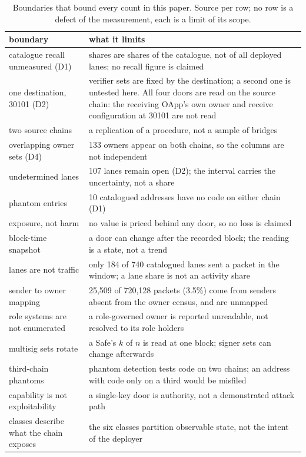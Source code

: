 \documentclass[10pt,a4paper]{article}
\newcommand{\code}[1]{\texttt{\detokenize{#1}}}
\begin{document}
\begin{table}[t]
\centering
\small
\caption{Boundaries that bound every count in this paper. Source per row; no row is a defect of the
measurement, each is a limit of its scope.}
\label{tab:bounds}
\renewcommand{\arraystretch}{1.08}
\begin{tabular}{@{}L{5.6cm}L{9.3cm}@{}}
\toprule
boundary & what it limits\\
\midrule
catalogue recall unmeasured (D1) & shares are shares of the catalogue, not of all deployed lanes; no recall figure is claimed \code{[CLAIMS:8]}\\
one destination, 30101 (D2) & verifier sets are fixed by the destination; a second one is untested here. All four doors are read on the source chain: the receiving OApp's own owner and receive configuration at 30101 are not read\\
two source chains & a replication of a procedure, not a sample of bridges \code{[BASE-LANES:3]}\\
overlapping owner sets (D4) & 133 owners appear on both chains, so the columns are not independent\\
undetermined lanes & 107 lanes remain open (D2); the interval carries the uncertainty, not a share\\
phantom entries & 10 catalogued addresses have no code on either chain (D1)\\
exposure, not harm & no value is priced behind any door, so no loss is claimed \code{[RESULTS:R6]}\\
block-time snapshot & a door can change after the recorded block; the reading is a state, not a trend\\
lanes are not traffic & only 184 of 740 catalogued lanes sent a packet in the window; a lane share is not an activity share \code{[KEY-TRAFFIC:4]}\\
sender to owner mapping & 25,509 of 720,128 packets (3.5\%) come from senders absent from the owner census, and are unmapped\\
role systems are not enumerated & a role-governed owner is reported unreadable, not resolved to its role holders\\
multisig sets rotate & a Safe's $k$ of $n$ is read at one block; signer sets can change afterwards\\
third-chain phantoms & phantom detection tests code on two chains; an address with code only on a third would be misfiled\\
capability is not exploitability & a single-key door is authority, not a demonstrated attack path\\
classes describe what the chain exposes & the six classes partition observable state, not the intent of the deployer\\
\bottomrule
\end{tabular}
\end{table}
\end{document}
